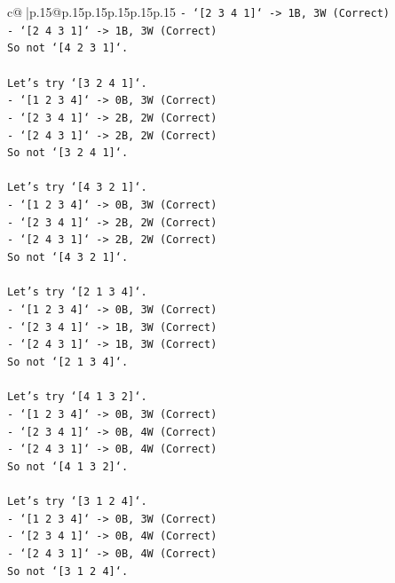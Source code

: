\documentclass{article}
\begin{document}
{\begin{supertabular}{c@{$\;$}|p{.15\linewidth}@{}p{.15\linewidth}p{.15\linewidth}p{.15\linewidth}p{.15\linewidth}p{.15\linewidth}}
{{{\texttt{{-} `{[}2 3 4 1{]}` {-}> 1B, 3W (Correct)} \\
\texttt{{-} `{[}2 4 3 1{]}` {-}> 1B, 3W (Correct)} \\
\texttt{So not `{[}4 2 3 1{]}`.} \\
\\ 
\texttt{Let's try `{[}3 2 4 1{]}`.} \\
\texttt{{-} `{[}1 2 3 4{]}` {-}> 0B, 3W (Correct)} \\
\texttt{{-} `{[}2 3 4 1{]}` {-}> 2B, 2W (Correct)} \\
\texttt{{-} `{[}2 4 3 1{]}` {-}> 2B, 2W (Correct)} \\
\texttt{So not `{[}3 2 4 1{]}`.} \\
\\ 
\texttt{Let's try `{[}4 3 2 1{]}`.} \\
\texttt{{-} `{[}1 2 3 4{]}` {-}> 0B, 3W (Correct)} \\
\texttt{{-} `{[}2 3 4 1{]}` {-}> 2B, 2W (Correct)} \\
\texttt{{-} `{[}2 4 3 1{]}` {-}> 2B, 2W (Correct)} \\
\texttt{So not `{[}4 3 2 1{]}`.} \\
\\ 
\texttt{Let's try `{[}2 1 3 4{]}`.} \\
\texttt{{-} `{[}1 2 3 4{]}` {-}> 0B, 3W (Correct)} \\
\texttt{{-} `{[}2 3 4 1{]}` {-}> 1B, 3W (Correct)} \\
\texttt{{-} `{[}2 4 3 1{]}` {-}> 1B, 3W (Correct)} \\
\texttt{So not `{[}2 1 3 4{]}`.} \\
\\ 
\texttt{Let's try `{[}4 1 3 2{]}`.} \\
\texttt{{-} `{[}1 2 3 4{]}` {-}> 0B, 3W (Correct)} \\
\texttt{{-} `{[}2 3 4 1{]}` {-}> 0B, 4W (Correct)} \\
\texttt{{-} `{[}2 4 3 1{]}` {-}> 0B, 4W (Correct)} \\
\texttt{So not `{[}4 1 3 2{]}`.} \\
\\ 
\texttt{Let's try `{[}3 1 2 4{]}`.} \\
\texttt{{-} `{[}1 2 3 4{]}` {-}> 0B, 3W (Correct)} \\
\texttt{{-} `{[}2 3 4 1{]}` {-}> 0B, 4W (Correct)} \\
\texttt{{-} `{[}2 4 3 1{]}` {-}> 0B, 4W (Correct)} \\
\texttt{So not `{[}3 1 2 4{]}`.} \\
}}}
\end{supertabular}}
\end{document}
